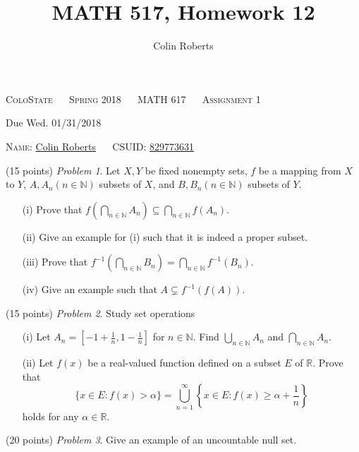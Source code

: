 \documentclass[leqno]{article}
\author{Colin Roberts}
\title{MATH 517, Homework 12}
\theoremstyle{nonumberplain}
\begin{document}
\begin{center}
  \textsc{\large ColoState ~~ Spring 2018 ~~ MATH 617 ~~ Assignment 1}
\end{center}

\begin{center}
  \textrm{Due Wed. 01/31/2018}
\end{center}

\vglue 0.15in

\bigskip
\noindent
\textsc{Name:} \underline{Colin Roberts\hglue 3.05in} ~~
\textsc{CSUID:} \underline{829773631\hglue 2.10in}

\vskip 0.25in

\bigskip
\noindent
(15 points) \textit{Problem 1}. \quad
Let $ X,Y $ be fixed nonempty sets,
$ f $ be a mapping from $ X $ to $ Y $,
$ A, A_n (n \in \mathbb{N}) $ subsets of $ X $,
and $ B, B_n (n \in \mathbb{N}) $ subsets of $ Y $.
\begin{itemize}
\item [(i)]
  Prove that
  $ \displaystyle f(\bigcap_{n \in \mathbb{N}} A_n) \subseteq \bigcap_{n \in \mathbb{N}} f(A_n) $.
\item [(ii)]
  Give an example for (i) such that it is indeed a proper subset.
\item [(iii)]
  Prove that
  $ \displaystyle f^{-1}(\bigcap_{n \in \mathbb{N}} B_n) = \bigcap_{n \in \mathbb{N}} f^{-1}(B_n) $.
\item [(iv)]
  Give an example such that
  $ \displaystyle A \subsetneq f^{-1}(f(A)) $.
\end{itemize}

\bigskip
\noindent
(15 points) \textit{Problem 2}. \quad
Study set operations
\begin{itemize}
\item [(i)]
  Let $ \displaystyle A_n = \left[ -1+\frac{1}{n}, 1-\frac{1}{n} \right] $
  for $ n \in \mathbb{N} $.
  Find $ \displaystyle \bigcup_{n \in \mathbb{N}} A_n $
  and $ \displaystyle \bigcap_{n \in \mathbb{N}} A_n $.
\item [(ii)]
  Let $ f(x) $ be a real-valued function
  defined on a subset $ E $ of $ \mathbb{R} $.
  Prove that
  $$
    \displaystyle
    \{ x \in E: f(x)>\alpha \}
    = \bigcup_{n=1}^\infty \left\{ x \in E: f(x) \ge \alpha + \frac{1}{n} \right\}
  $$
  holds for any $ \alpha \in \mathbb{R} $.
\end{itemize}

\bigskip
\noindent
(20 points) \textit{Problem 3}. \quad
Give an example of an uncountable null set.
\end{document}
